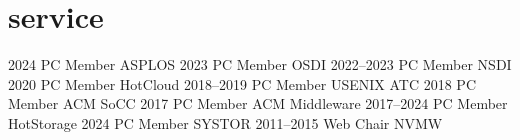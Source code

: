 \section{service}

\begin{entrylist}
    \eduentry
    {2024}
    {PC Member}
    {ASPLOS}
    \eduentry
    {2023}
    {PC Member}
    {OSDI}
    \eduentry
    {2022--2023}
    {PC Member}
    {NSDI}
    \eduentry
    {2020}
    {PC Member}
    {HotCloud}
    \eduentry
    {2018--2019}
    {PC Member}
    {USENIX ATC}
    \eduentry
    {2018}
    {PC Member}
    {ACM SoCC}
    \eduentry
    {2017}
    {PC Member}
    {ACM Middleware}
    \eduentry
    {2017--2024}
    {PC Member}
    {HotStorage}
    \eduentry
    {2024}
    {PC Member}
    {SYSTOR}
    \eduentry
    {2011--2015}
    {Web Chair}
    {NVMW}
\end{entrylist}